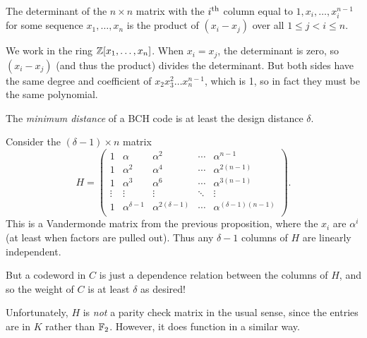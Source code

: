 \documentclass{article}
\begin{document}
\begin{proposition}
    The determinant of the $n \times n$ matrix with the $i^{\text{th}}$ column equal to $1, x_i, \dots, x_i^{n-1}$ for some sequence $x_1, \dots, x_n$ is the product of $(x_i - x_j)$ over all $1 \leq j < i \leq n$.
\end{proposition}

\begin{prf}
    We work in the ring $\mathbb{Z}[x_1, \dots, x_n]$. When $x_i = x_j$, the determinant is zero, so $(x_i - x_j)$ (and thus the product) divides the determinant. But both sides have the same degree and coefficient of $x_2x_3^2\dots x_n^{n-1}$, which is 1, so in fact they must be the same polynomial.
\end{prf}

\begin{theorem}
    The \textit{minimum distance} of a BCH code is at least the design distance $\delta$.
\end{theorem}

\begin{prf}
    Consider the $(\delta-1) \times n$ matrix
    \[
	H = \begin{pmatrix}
		1 & \alpha & \alpha^2 & \cdots & \alpha^{n-1} \\
		1 & \alpha^2 & \alpha^4 & \cdots & \alpha^{2(n-1)} \\
		1 & \alpha^3 & \alpha^6 & \cdots & \alpha^{3(n-1)} \\
		\vdots & \vdots & \vdots & \ddots & \vdots \\
		1 & \alpha^{\delta-1} & \alpha^{2(\delta-1)} & \cdots & \alpha^{(\delta-1)(n-1)} \\
	\end{pmatrix}.
	\]
	This is a Vandermonde matrix from the previous proposition, where the $x_i$ are $\alpha^i$ (at least when factors are pulled out). Thus any $\delta-1$ columns of $H$ are linearly independent.
	
	But a codeword in $C$ is just a dependence relation between the columns of $H$, and so the weight of $C$ is at least $\delta$ as desired!
\end{prf}

\begin{note}
	Unfortunately, $H$ is \textit{not} a parity check matrix in the usual sense, since the entries are in $K$ rather than $\mathbb{F}_2$. However, it does function in a similar way.
\end{note}
\end{document}
